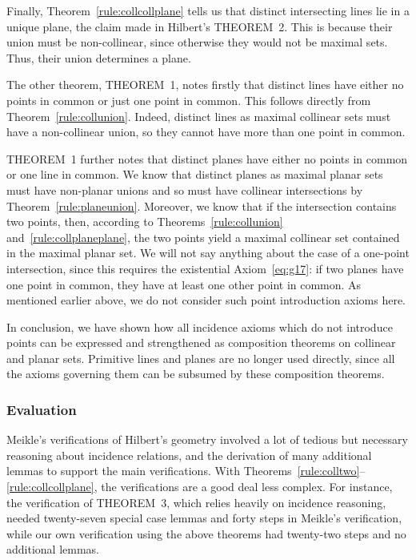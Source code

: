 Finally, Theorem~\ref{rule:collcollplane} tells us that distinct intersecting lines lie in a unique plane, the claim made in Hilbert's THEOREM~2. This is because their union must be non-collinear, since otherwise they would not be maximal sets. Thus, their union determines a plane. 

The other theorem, THEOREM~1, notes firstly that distinct lines have either no points in common or just one point in common. This follows directly from Theorem~\ref{rule:collunion}. Indeed, distinct lines as maximal collinear sets must have a non-collinear union, so they cannot have more than one point in common.

THEOREM~1 further notes that distinct planes have either no points in common or one line in common. We know that distinct planes as maximal planar sets must have non-planar unions and so must have collinear intersections by Theorem~\ref{rule:planeunion}. Moreover, we know that if the intersection contains two points, then, according to Theorems~\ref{rule:collunion} and~\ref{rule:collplaneplane}, the two points yield a maximal collinear set contained in the maximal planar set. We will not say anything about the case of a one-point intersection, since this requires the existential Axiom~\ref{eq:g17}: if two planes have one point in common, they have at least one other point in common. As mentioned earlier above, we do not consider such point introduction axioms here.

In conclusion, we have shown how all incidence axioms which do not introduce points can be expressed and strengthened as composition theorems on collinear and planar sets. Primitive lines and planes are no longer used directly, since all the axioms governing them can be subsumed by these composition theorems.

\subsubsection{Evaluation}
Meikle's verifications of Hilbert's geometry involved a lot of tedious but necessary reasoning about incidence relations, and the derivation of many additional lemmas to support the main verifications. With Theorems~\ref{rule:colltwo}--\ref{rule:collcollplane}, the verifications are a good deal less complex. For instance, the verification of THEOREM~3, which relies heavily on incidence reasoning, needed twenty-seven special case lemmas and forty steps in Meikle's verification, while our own verification using the above theorems had twenty-two steps and no additional lemmas. 

